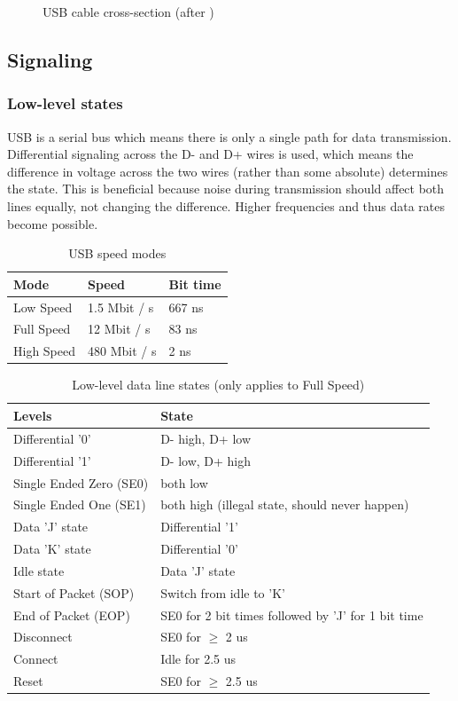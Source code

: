 \documentclass{article}
\begin{document}
\begin{figure}[H]
  \caption{USB cable cross-section (after \cite[p. 17]{usbstd})}
  \centering
  \scalebox{2}{}
\end{figure}

\subsection{Signaling}

\subsubsection{Low-level states}

USB is a serial bus which means there is only a single path for data transmission.
Differential signaling across the D- and D+ wires is used, which means the difference in voltage
across the two wires (rather than some absolute) determines the state. This is beneficial because
noise during transmission should affect both lines equally, not changing the difference.
Higher frequencies and thus data rates become possible.

\begin{table}[H]
  \caption{USB speed modes \cite[p. 159]{usbstd}}
  \centering
  \begin{tabular}{l | l | l}
    Mode & Speed & Bit time \\ \hline
    Low Speed & 1.5 Mbit / s & 667 ns \\
    Full Speed & 12 Mbit / s & 83 ns \\
    High Speed & 480 Mbit / s & 2 ns \\
  \end{tabular}
\end{table}

\begin{table}[H]
  \caption{Low-level data line states (only applies to Full Speed) \cite[p. 145]{usbstd}}
  \centering
  \begin{tabular}{l | l}
    Levels & State \\ \hline
    Differential '0' & D- high, D+ low \\
    Differential '1' & D- low, D+ high \\
    Single Ended Zero (SE0) & both low \\
    Single Ended One (SE1) & both high (illegal state, should never happen) \\
    Data 'J' state & Differential '1' \\
    Data 'K' state & Differential '0' \\
    Idle state & Data 'J' state \\
    Start of Packet (SOP) & Switch from idle to 'K' \\
    End of Packet (EOP) & SE0 for 2 bit times followed by 'J' for 1 bit time \\
    Disconnect & SE0 for $\geq$ 2 us \\
    Connect & Idle for 2.5 us \\
    Reset & SE0 for $\geq$ 2.5 us \\
  \end{tabular}
\end{table}
\end{document}
